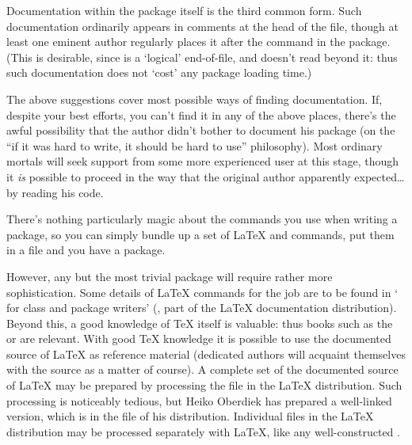 Documentation within the package itself is the third common form.
Such documentation ordinarily appears in comments at the head of the
file, though at least one eminent author regularly places it after the
 command in the package.  (This is desirable, since
 is a `logical' end-of-file, and \AllTeX{} doesn't read
beyond it: thus such documentation does not `cost' any package loading time.)

The above suggestions cover most possible ways of finding
documentation.  If, despite your best efforts, you can't find
it in any of the above places, there's the awful possibility that the
author didn't bother to document his package (on the ``if it was hard
to write, it should be hard to use'' philosophy).  Most ordinary
mortals will seek support from some more experienced user at this
stage, though it \emph{is} possible to proceed in the way that the original
author apparently expected\dots{}by reading his code.


There's nothing particularly magic about the commands you use when
writing a package, so you can simply bundle up a set of \LaTeX{}
 and  commands, put them in
a file  and you have a package.

However, any but the most trivial package will require rather more
sophistication.  Some details of \LaTeX{} commands for the job are to
be found in `\LaTeXe{} for class and package writers'
(, part of the \LaTeX{} documentation distribution).
Beyond this, a good knowledge of \TeX{} itself is valuable: thus books
such as the  or %
 are relevant.  With good \TeX{}
knowledge it is possible to use the documented source of \LaTeX{} as
reference material (dedicated authors will acquaint themselves with the
source as a matter of course).  A complete set of the documented
source of \LaTeX{} may be prepared by processing the file
 in the \LaTeX{} distribution.  Such processing is
noticeably tedious, but Heiko Oberdiek has prepared a well-linked
 version, which is in the file  of his
 distribution.  Individual files in the \LaTeX{}
distribution may be processed separately with \LaTeX{}, like any
well-constructed .

